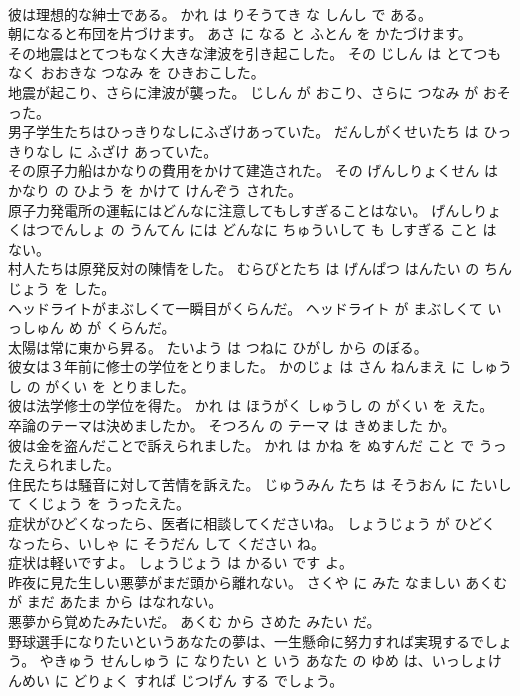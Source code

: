 \documentclass[8pt]{extreport}
\begin{document}
\begin{CJK}{UTF8}{min}
\\	彼は理想的な紳士である。	かれ は りそうてき な しんし で ある。	
\\	朝になると布団を片づけます。	あさ に なる と ふとん を かたづけます。	
\\	その地震はとてつもなく大きな津波を引き起こした。	その じしん は とてつも なく おおきな つなみ を ひきおこした。	
\\	地震が起こり、さらに津波が襲った。	じしん が おこり、さらに つなみ が おそった。	
\\	男子学生たちはひっきりなしにふざけあっていた。	だんしがくせいたち は ひっきりなし に ふざけ あっていた。	
\\	その原子力船はかなりの費用をかけて建造された。	その げんしりょくせん は かなり の ひよう を かけて けんぞう された。	
\\	原子力発電所の運転にはどんなに注意してもしすぎることはない。	げんしりょくはつでんしょ の うんてん には どんなに ちゅういして も しすぎる こと は ない。	
\\	村人たちは原発反対の陳情をした。	むらびとたち は げんぱつ はんたい の ちんじょう を した。	
\\	ヘッドライトがまぶしくて一瞬目がくらんだ。	ヘッドライト が まぶしくて いっしゅん め が くらんだ。	
\\	太陽は常に東から昇る。	たいよう は つねに ひがし から のぼる。	
\\	彼女は３年前に修士の学位をとりました。	かのじょ は さん ねんまえ に しゅうし の がくい を とりました。	
\\	彼は法学修士の学位を得た。	かれ は ほうがく しゅうし の がくい を えた。	
\\	卒論のテーマは決めましたか。	そつろん の テーマ は きめました か。	
\\	彼は金を盗んだことで訴えられました。	かれ は かね を ぬすんだ こと で うったえられました。	
\\	住民たちは騒音に対して苦情を訴えた。	じゅうみん たち は そうおん に たいして くじょう を うったえた。	
\\	症状がひどくなったら、医者に相談してくださいね。	しょうじょう が ひどく なったら、いしゃ に そうだん して ください ね。	
\\	症状は軽いですよ。	しょうじょう は かるい です よ。	
\\	昨夜に見た生しい悪夢がまだ頭から離れない。	さくや に みた なましい あくむ が まだ あたま から はなれない。	
\\	悪夢から覚めたみたいだ。	あくむ から さめた みたい だ。	
\\	野球選手になりたいというあなたの夢は、一生懸命に努力すれば実現するでしょう。	やきゅう せんしゅう に なりたい と いう あなた の ゆめ は、いっしょけんめい に どりょく すれば じつげん する でしょう。	

\end{CJK}
\end{document}
